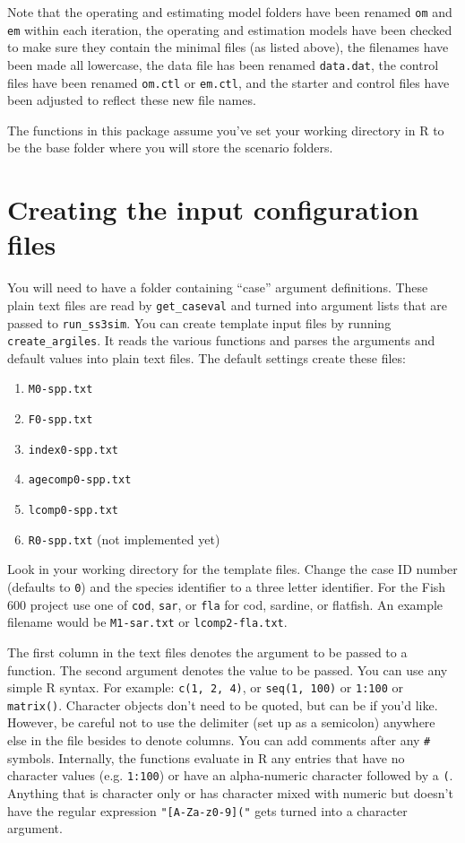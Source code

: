 \documentclass[12pt]{article}
\begin{document}
\noindent
Note that the operating and estimating model folders have been renamed
\texttt{om} and \texttt{em} within each iteration, the operating and estimation 
models have been checked to make sure they contain the minimal files (as listed 
above), the filenames have been made all lowercase, the data file has been 
renamed \texttt{data.dat}, the control files have been renamed \texttt{om.ctl} 
or \texttt{em.ctl}, and the starter and control files have been adjusted to 
reflect these new file names.

The functions in this package assume you've set your working directory in R to 
be the base folder where you will store the scenario folders.

\section*{Creating the input configuration files}
You will need to have a folder containing ``case'' argument definitions. These 
plain text files are read by \texttt{get\_caseval} and turned into argument 
lists that are passed to \texttt{run\_ss3sim}. You can create template input 
files by running \texttt{create\_argiles}. It reads the various functions and 
parses the arguments and default values into plain text files. The default 
settings create these files:

\begin{enumerate}
  \item \texttt{M0-spp.txt}
  \item \texttt{F0-spp.txt}
  \item \texttt{index0-spp.txt}
  \item \texttt{agecomp0-spp.txt}
  \item \texttt{lcomp0-spp.txt}
  \item \texttt{R0-spp.txt} (not implemented yet)
\end{enumerate}

Look in your working directory for the template files. Change the case ID 
number (defaults to \texttt{0}) and the species identifier to a three letter 
identifier. For the Fish 600 project use one of \texttt{cod}, \texttt{sar}, or 
\texttt{fla} for cod, sardine, or flatfish. An example filename would be 
\texttt{M1-sar.txt} or \texttt{lcomp2-fla.txt}.

The first column in the text files denotes the argument to be passed to a 
function. The second argument denotes the value to be passed. You can use any 
simple R syntax. For example: \texttt{c(1, 2, 4)}, or \texttt{seq(1, 100)} or 
\texttt{1:100} or \texttt{matrix()}. Character objects don't need to be quoted, 
but can be if you'd like. However, be careful not to use the delimiter (set up 
as a semicolon) anywhere else in the file besides to denote columns. You can 
add comments after any \texttt{\#} symbols. Internally, the functions evaluate 
in R any entries that have no character values (e.g. \texttt{1:100}) or have an 
alpha-numeric character followed by a \texttt{(}. Anything that is character 
only or has character mixed with numeric but doesn't have the regular 
expression \texttt{"[A-Za-z0-9]("} gets turned into a character argument.
\end{document}
